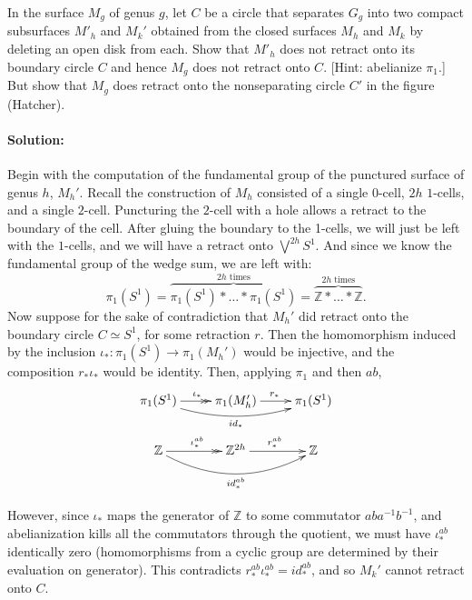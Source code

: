\documentclass{article}
\begin{document}
\begin{exe}
    
    In the surface $M_g$ of genus $g$, let $C$ be a circle that separates $G_g$ into two compact subsurfaces $M'_h$ and $M_k'$ obtained from the closed surfaces $M_h$ and $M_k$ by deleting an open disk from each. Show that $M'_h$ does not retract onto its boundary circle $C$ and hence $M_g$ does not retract onto $C$. [Hint: abelianize $\pi_1$.] But show that $M_g$ does retract onto the nonseparating circle $C'$ in the figure (Hatcher).
\end{exe}
\paragraph{Solution: }


Begin with the computation of the fundamental group of the punctured surface of genus $h$, $M_h'$. Recall the construction of $M_h$ consisted of a single $0$-cell, $2h$ $1$-cells, and a single $2$-cell. Puncturing the $2$-cell with a hole allows a retract to the boundary of the cell. After gluing the boundary to the 1-cells, we will just be left with the $1$-cells, and we will have a retract onto $\bigvee^{2h}S^{1}$. And since we know the fundamental group of the wedge sum, we are left with: 
\[
    \pi_1(S^{1})=\overbrace{\pi_1(S^{1})*\dots*\pi_1(S^{1})}^{2h\text{ times}}=\overbrace{\mathbb{Z}*\dots* \mathbb{Z} }^{2h\text{ times}}
.\] 
Now suppose for the sake of contradiction that $M_h'$ did retract onto the boundary circle $C\simeq S^{1}$, for some retraction $r$. Then the homomorphism induced by the inclusion $\iota_*:\pi_1(S^1)\to \pi_1(M_h')$ would be injective, and the composition $r_*\iota_*$ would be identity. Then, applying $\pi_1$ and then $ab$,
\[\xymatrix{
        \pi_1(S^1)\ar@/_1pc/[rr]_{id_*}\ar@{->>}[r]^{\iota_*}&\pi_1(M_h')\ar@{->}[r]^{r_*}&\pi_1(S^{1})\\
    \mathbb{Z}\ar@/_1.5pc/[rr]_{id_*^{ab}}\ar@{->>}[r]^{\iota_*^{ab}}&\mathbb{Z}^{2h} \ar@{->}[r]^{r_*^{ab}}&\mathbb{Z}
}\]

However, since $\iota_*$ maps the generator of $\mathbb{Z}$ to some commutator $aba^{-1}b^{-1}$, and abelianization kills all the commutators through the quotient, we must have $\iota_*^{ab}$ identically zero (homomorphisms from a cyclic group are determined by their evaluation on generator). This contradicts $r_*^{ab}\iota_*^{ab}=id_*^{ab}$, and so $M_k'$ cannot retract onto $C$.
\end{document}
